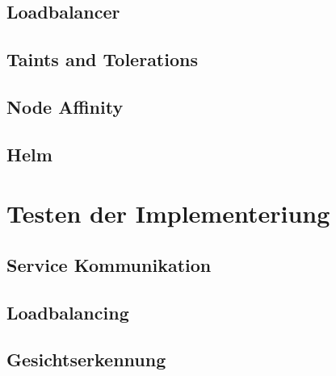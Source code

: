 \subsection{Loadbalancer}
\subsection{Taints and Tolerations}
\subsection{Node Affinity}
\subsection{Helm}


\section{Testen der Implementeriung}
\subsection{Service Kommunikation}
\subsection{Loadbalancing}
\subsection{Gesichtserkennung}
